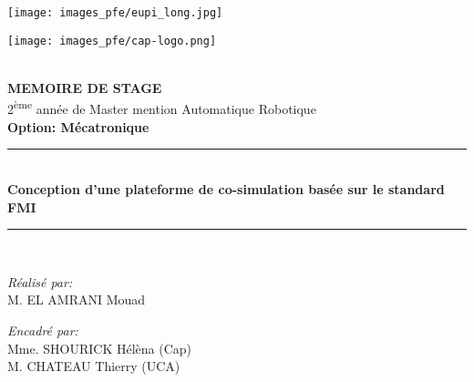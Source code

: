 \documentclass[a4paper,12pt]{report}
\begin{document}
\begin{titlepage}
  \centering
  \begin{minipage}{10cm}
    \begin{flushleft}
      \texttt{[image: images\_pfe/eupi\_long.jpg]}
    \end{flushleft}
  \end{minipage}\hfill
  \begin{minipage}{5cm}
    \begin{flushright}
      \texttt{[image: images\_pfe/cap-logo.png]}
    \end{flushright}
  \end{minipage}\hfill\\
  \vspace{20mm}
  {\large \bfseries MEMOIRE DE STAGE}\\[0.5cm]
  {\large 2\textsuperscript{ème} année de Master mention Automatique Robotique}\\[0.5cm]
  {\large \bfseries{Option: Mécatronique} \\ }
  \vspace{20mm}
  \rule{\linewidth}{0.3mm} \\[0.4cm]
  { \huge \bfseries Conception d'une plateforme de co-simulation basée sur le standard FMI \\[0.4cm] }
  \rule{\linewidth}{0.3mm} \\[0.3cm]

  \vspace{20mm}

  \noindent
  \begin{minipage}[t]{0.4\textwidth}
    \begin{flushleft} \large
      \emph{Réalisé par: }\\
      M. \textsc{EL AMRANI} Mouad \\
    \end{flushleft}
  \end{minipage}
  \begin{minipage}[t]{0.55\textwidth}
    \begin{flushright} \large
      \begin{flushleft} \large
        \emph{Encadré par: } \\
        Mme. \textsc{SHOURICK} Hélèna  (Cap)\\
        M. \textsc{CHATEAU} Thierry (UCA)\\

      \end{flushleft}


\end{flushright}
\end{minipage}
\end{titlepage}
\end{document}
